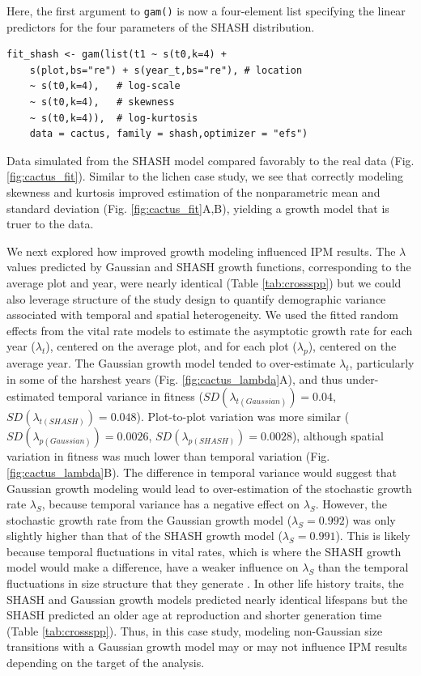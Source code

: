 \documentclass[12pt]{article}
\begin{document}
\begin{spacing}{1.9}
Here, the first argument to \texttt{gam()} is now a four-element list specifying the linear predictors for the four parameters of the SHASH distribution.
\begin{lstlisting}
fit_shash <- gam(list(t1 ~ s(t0,k=4) + 
    s(plot,bs="re") + s(year_t,bs="re"), # location 
    ~ s(t0,k=4),   # log-scale
    ~ s(t0,k=4),   # skewness
    ~ s(t0,k=4)),  # log-kurtosis
    data = cactus, family = shash,optimizer = "efs")
\end{lstlisting}
Data simulated from the SHASH model compared favorably to the real data (Fig. \ref{fig:cactus_fit}). 
Similar to the lichen case study, we see that correctly modeling skewness and kurtosis improved estimation of the nonparametric 
mean and standard deviation (Fig. \ref{fig:cactus_fit}A,B), yielding a growth model that is truer to the data. 

We next explored how improved growth modeling influenced IPM results.
The $\lambda$ values predicted by Gaussian and SHASH growth functions, corresponding to the average plot and year, were nearly identical (Table \ref{tab:crossspp}) but we could also leverage structure of the study design to quantify demographic variance associated with temporal and spatial heterogeneity.
We used the fitted random effects from the vital rate models to estimate the asymptotic growth rate for each year ($\lambda_t$), centered on the average plot, and for each plot ($\lambda_p$), centered on the average year.
The Gaussian growth model tended to over-estimate $\lambda_t$, particularly in some of the harshest years (Fig. \ref{fig:cactus_lambda}A), and thus under-estimated temporal variance in fitness ($SD(\lambda_{t(Gaussian)})=0.04$, $SD(\lambda_{t(SHASH)})=0.048$). 
Plot-to-plot variation was more similar ($SD(\lambda_{p(Gaussian)})=0.0026$, $SD(\lambda_{p(SHASH)})=0.0028$), although spatial variation in fitness was much lower than temporal variation (Fig. \ref{fig:cactus_lambda}B). 
The difference in temporal variance would suggest that Gaussian growth modeling would lead to over-estimation of the stochastic growth rate $\lambda_S$, because temporal variance has a negative effect on $\lambda_S$.
However, the stochastic growth rate from the Gaussian growth model ($\lambda_S=0.992$) was only slightly higher than that of the SHASH growth model ($\lambda_S=0.991$).  
This is likely because temporal fluctuations in vital rates, which is where the SHASH growth model would make a difference, have a weaker influence on $\lambda_S$ than the temporal fluctuations in size structure that they generate \citep{ellis2013role,compagnoni2016effect}. 
In other life history traits, the SHASH and Gaussian growth models predicted nearly identical lifespans but the SHASH predicted an older age at reproduction and shorter generation time (Table \ref{tab:crossspp}). 
Thus, in this case study, modeling non-Gaussian size transitions with a Gaussian growth model may or may not influence IPM results depending on the target of the analysis. 


\end{spacing}
\end{document}
